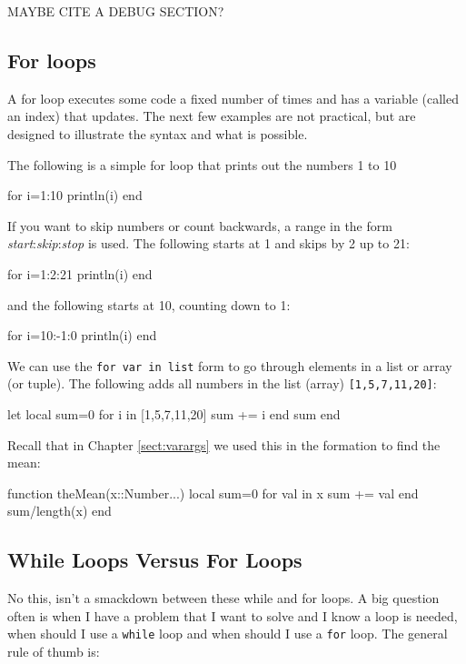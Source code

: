 {\color{red} MAYBE CITE A DEBUG SECTION?} 

\subsection{For loops}

A for loop executes some code a fixed number of times and has a variable
(called an index) that updates.  The next few examples are not practical, but are designed to illustrate the syntax and what is possible. 

The following is a simple for loop that prints out the numbers 1 to 10
%
\begin{jlblock}[bool]
for i=1:10
  println(i)
end
\end{jlblock}

If you want to skip numbers or count backwards, a range in the form \emph{start}:\emph{skip}:\emph{stop} is used.  The following starts at 1 and skips by 2 up to 21: 

\begin{jlblock}[bool]
for i=1:2:21
  println(i)
end
\end{jlblock}
%
and the following starts at 10, counting down to 1: 
%
\begin{jlblock}[bool]
for i=10:-1:0
  println(i)
end
\end{jlblock}

We can use the \texttt{for var in list} form to go through elements in a list or array (or tuple).  The following adds all numbers in the list (array) \texttt{[1,5,7,11,20]}: 
%
\begin{jlblock}[bool]
let
  local sum=0
  for i in [1,5,7,11,20]
    sum += i
  end
  sum
end
\end{jlblock}

Recall that in Chapter \ref{sect:varargs} we used this in the formation to find the mean:
\begin{jlblock}[bool]
function theMean(x::Number...) local sum=0
  for val in x
    sum += val 
  end
  sum/length(x) 
end
\end{jlblock}


\subsection{While Loops Versus For Loops}

No this, isn't a smackdown between these while and for loops. A big question often is when I have a problem that I want to solve and I know a loop is needed, when should I use a \texttt{while} loop and when should I use a \texttt{for} loop. The general rule of thumb is:

